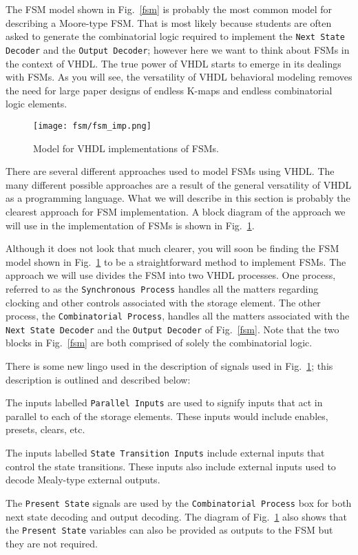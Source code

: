 The FSM model shown in Fig.~\ref{fsm} is probably the most common model for describing a Moore-type FSM. That is most likely because students are often asked to generate the combinatorial logic required to implement the \texttt{Next State Decoder} and the \texttt{Output Decoder}; however here we want to think about FSMs in the context of VHDL. The true power of VHDL starts to emerge in its dealings with FSMs. As you will see, the versatility of VHDL behavioral modeling removes the need for large paper designs of endless K-maps and endless combinatorial logic elements.

\begin{figure}[t]
    \centering
	\texttt{[image: fsm/fsm\_imp.png]}
	\caption{Model for VHDL implementations of FSMs.}
	\label{fsm_imp}
\end{figure}

There are several different approaches used to model FSMs using VHDL. The many different possible approaches are a result of the general versatility of VHDL as a programming language. What we will describe in this section is probably the clearest approach for FSM implementation. A block diagram of the approach we will use in the implementation of FSMs is shown in Fig.~\ref{fsm_imp}.

Although it does not look that much clearer, you will soon be finding the FSM model shown in Fig.~\ref{fsm_imp} to be a straightforward method to implement FSMs. The approach we will use divides the FSM into two VHDL processes. One process, referred to as the \texttt{Synchronous Process} handles all the matters regarding clocking and other controls associated with the storage element. The other process, the \texttt{Combinatorial Process}, handles all the matters associated with the \texttt{Next State Decoder} and the \texttt{Output Decoder} of Fig.~\ref{fsm}. Note that the two blocks in Fig.~\ref{fsm} are both comprised of solely the combinatorial logic.


There is some new lingo used in the description of signals used in Fig.~\ref{fsm_imp}; this description is outlined and described below: 
\begin{my_list}
\item The inputs labelled \texttt{Parallel Inputs} are used to signify inputs that act in parallel to each of the storage elements. These inputs would include enables, presets, clears, etc. 

\item The inputs labelled \texttt{State Transition Inputs} include external inputs that control the state transitions. These inputs also include external inputs used to decode Mealy-type external outputs. 

\item The \texttt{Present State} signals are used by the \texttt{Combinatorial Process} box for both next state decoding and output decoding. The diagram of Fig.~\ref{fsm_imp} also shows that the \texttt{Present State} variables can also be provided as outputs to the FSM but they are not required.
\end{my_list}

